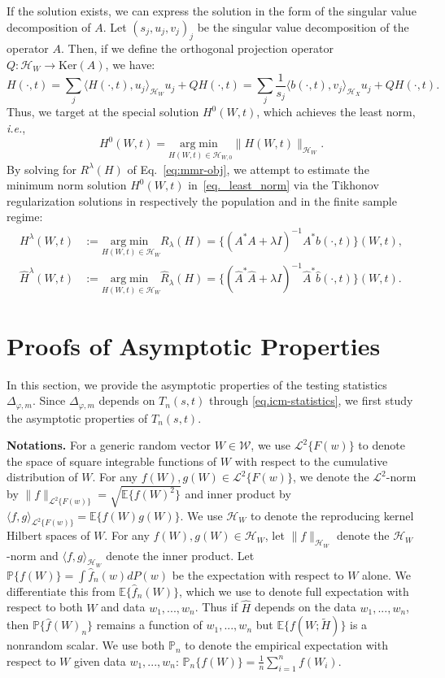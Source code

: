 \documentclass[
  12pt]{article}
\def\to{\rightarrow}
\def\wt{\widetilde}
\def\wh{\widehat}
\def\mP{\mathbb{P}}
\def\cH{\mathcal{H}}
\def\cL{\mathcal{L}}
\def\cW{\mathcal{W}}
\begin{document}
If the solution exists, we can express the solution in the form of the singular value decomposition of $A$. Let $(s_j,u_j,v_j)_{j}$ be the singular value decomposition of the operator $A$. Then, if we define the orthogonal projection operator $Q: \cH_W\to \mathrm{Ker}(A)$, we have:
$$
H(\cdot, t)=\sum_{j}\langle H(\cdot, t),u_j\rangle_{\cH_W}u_j+QH(\cdot, t)=\sum_{j}\frac{1}{s_j}\langle b(\cdot, t),v_j\rangle_{\cH_X}u_j+QH(\cdot, t).
$$
Thus, we target at the special solution $H^0(W,t)$, which achieves the least norm, \emph{i.e.}, 
\begin{equation}\label{eq._least_norm}
H^0(W,t) =\underset{H(W,t)\in \mathcal{H}_{W,0}}{\mathrm{arg}\min}\|H(W, t)\|_{\cH_W}.
\end{equation}
By solving for $R^{\lambda}(H)$ of Eq.~\eqref{eq:mmr-obj}, we attempt to estimate the minimum norm solution $H^0(W,t)$ in~\eqref{eq._least_norm} via the Tikhonov regularization solutions in respectively the population and in the finite sample regime:
\begin{eqnarray}
    H^{\lambda}(W,t)&:=\underset{H(W,t)\in \mathcal{H}_W}{\mathrm{arg}\min}R_{\lambda}(H) =\{( A^*A+\lambda I)^{-1}A^*b(\cdot,t)\}(W,t), \label{eq:h_pop} \\
    \widehat{H}^{\lambda}(W,t)&:=\underset{H(W,t)\in \mathcal{H}_W}{\mathrm{arg}\min}\widehat{R}_{\lambda}(H) =\{( \widehat{A}^*\widehat{A}+\lambda I)^{-1}\widehat{A}^*\widehat{b}(\cdot,t)\}(W,t). \label{eq:h_emp}
\end{eqnarray}


\section{Proofs of Asymptotic Properties}
In this section, we provide the asymptotic properties of the testing statistics $\Delta_{\varphi,m}$. Since $\Delta_{\varphi,m}$ depends on $T_n(s,t)$ through \eqref{eq.icm-statistics}, we first study the asymptotic properties of $T_n(s,t)$. 
 

\textbf{Notations.} For a generic random vector $W\in\cW$, we use $\cL^2\{F(w)\}$ to denote the space of square integrable functions of $W$ with respect to the cumulative distribution of $W$. For any $f(W),g(W)\in \cL^2\{F(w)\}$, we denote the $\cL^2$-norm by $\|f\|_{\cL^2\{F(w)\}}=\sqrt{\mathbb{E}\{f(W)^2\}}$ and inner product by $\langle f,g\rangle_{\cL^2\{F(w)\}}=\mathbb{E}\{f(W)g(W)\}$. We use $\cH_W$ to denote the reproducing kernel Hilbert spaces of $W$. For any $f(W),g(W)\in \cH_W$, let $\|f\|_{\cH_W}$ denote the $\cH_W$-norm and $\langle f,g\rangle_{\cH_W}$ denote the inner product. Let $\mathbb{P}\{f(W)\}=\int \wh{f}_n(w)dP(w)$ be the expectation with respect to $W$ alone. We differentiate this from $\mathbb{E}\{\wh{f}_n(W)\}$, which we use to denote full expectation with respect to both $W$ and data $w_1,...,w_n$. Thus if $\wh{H}$ depends on the data $w_1,...,w_n$, then $\mathbb{P}\{\wh{f}(W)_n\}$ remains a function of $w_1,...,w_n$ but $\mathbb{E}\{f(W;\wt{H})\}$ is a nonrandom scalar. We use both $\mP_n$ to denote the empirical expectation with respect to $W$ given data $w_1,...,w_n$: $\mP_n\{f(W)\}=\frac{1}{n}\sum_{i=1}^{n}f(W_{i})$. 
\end{document}
